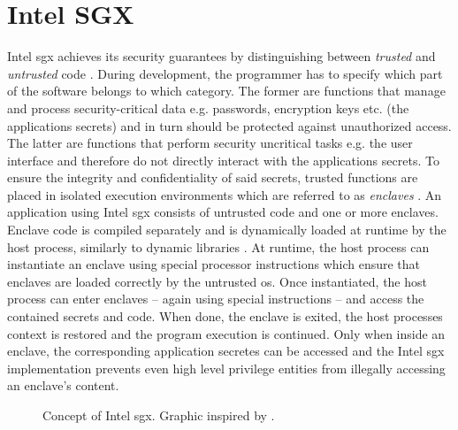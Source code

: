 \section{Intel SGX}
Intel \ac{sgx} achieves its security guarantees by distinguishing between \textit{trusted} and \textit{untrusted} code \cite{IntelWebBasedTraining}. During development,
the programmer has to specify which part of the software belongs to which category. The former are functions that manage and process security-critical data e.g. passwords,
encryption keys etc. (the applications secrets) and in turn should be protected against unauthorized access. The latter are functions that perform security uncritical 
tasks e.g. the user interface and therefore do not directly interact with the applications secrets. To ensure the integrity and confidentiality of said secrets, trusted 
functions are placed in isolated execution environments which are referred to as \textit{enclaves} \cite{UseOfIntelSGX}. An application using Intel \ac{sgx} consists of untrusted 
code and one or more enclaves. Enclave code is compiled separately and is dynamically loaded at runtime by the host process, similarly to dynamic libraries \cite{Costan2016IntelSE}.
At runtime, the host process can instantiate an enclave using special processor instructions which ensure that enclaves are loaded correctly by the untrusted \ac{os}. 
Once instantiated, the host process can enter enclaves -- again using special instructions -- and access the contained secrets and code. When done, the enclave is exited,
the host processes context is restored and the program execution is continued. Only when inside an enclave, the corresponding application secretes can be accessed and the
Intel \ac{sgx} implementation prevents even high level privilege entities from illegally accessing an enclave's content.
\begin{figure}[h!]
    \centering
    \caption{Concept of Intel \ac{sgx}. Graphic inspired by \cite{IntelSGXExplanation}.}
    \label{fig:enclaveCall}
\end{figure}





